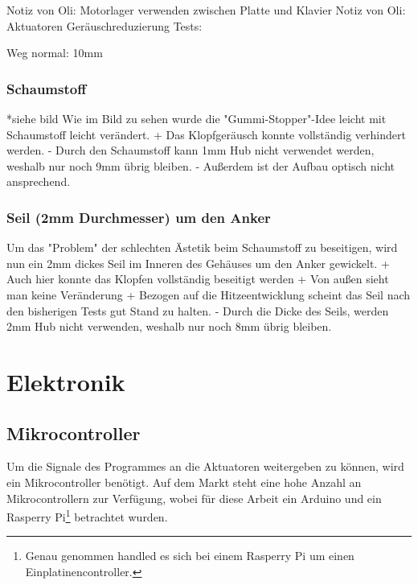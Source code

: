 Notiz von Oli: Motorlager verwenden zwischen Platte und Klavier
Notiz von Oli:
Aktuatoren Geräuschreduzierung Tests:

Weg normal: 10mm

\subsubsection{Schaumstoff}

*siehe bild
Wie im Bild zu sehen wurde die "Gummi-Stopper"-Idee leicht mit Schaumstoff leicht verändert.
+ Das Klopfgeräusch konnte vollständig verhindert werden.
- Durch den Schaumstoff kann 1mm Hub nicht verwendet werden, weshalb nur noch 9mm übrig bleiben.
- Außerdem ist der Aufbau optisch nicht ansprechend.


\subsubsection{Seil (2mm Durchmesser) um den Anker}

Um das "Problem" der schlechten Ästetik beim Schaumstoff zu beseitigen, wird nun ein 2mm dickes Seil im Inneren des Gehäuses um den Anker gewickelt. \newline
+ Auch hier konnte das Klopfen vollständig beseitigt werden \newline
+ Von außen sieht man keine Veränderung \newline
+ Bezogen auf die Hitzeentwicklung scheint das Seil nach den bisherigen Tests gut Stand zu halten. \newline
- Durch die Dicke des Seils, werden 2mm Hub nicht verwenden, weshalb nur noch 8mm übrig bleiben.


\section{Elektronik}\label{Vorgehen - Hardware}


\subsection{Mikrocontroller}\label{Ansteuerung}
Um die Signale des Programmes an die Aktuatoren weitergeben zu können, wird ein Mikrocontroller benötigt.
Auf dem Markt steht eine hohe Anzahl an Mikrocontrollern zur Verfügung, wobei für diese Arbeit ein Arduino und ein Rasperry Pi\footnote{Genau genommen handled es sich bei einem Rasperry Pi um einen Einplatinencontroller.} betrachtet wurden.

